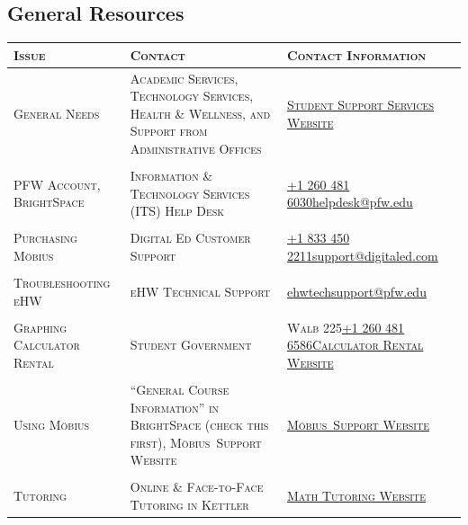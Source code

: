 \documentclass[letterpaper,twoside]{article}
\def\Mobius{M\"obius\ }
\begin{document}
    \subsection*{General Resources}
    \begin{center}
        \onehalfspacing
        \begin{tabularx}{\columnwidth}{lXX}
            \textsc{Issue} & \textsc{Contact} & \textsc{Contact Information}\\
            \hline
            \textsc{General Needs} & \textsc{Academic Services, Technology Services, Health \& Wellness, and Support from Administrative Offices} & \textsc{\href{https://www.pfw.edu/offices/enhancement-learning-teaching/pedagogical-resources/student-support-services}{Student Support Services Website}}\\
            \\
            \textsc{PFW Account, BrightSpace} &\textsc{Information \& Technology Services (ITS) Help Desk} & \href{tel:12604816030}{+1 260 481 6030}\newline\href{mailto:helpdesk@pfw.edu}{helpdesk@pfw.edu}\\
            \\
            \textsc{Purchasing \Mobius} & \textsc{Digital Ed Customer Support} & \href{tel:18334502211}{+1 833 450 2211}\newline\href{mailto:support@digitaled.com}{support@digitaled.com} \\
            \\
            \textsc{Troubleshooting eHW} & \textsc{eHW Technical Support} & \href{mailto:ehwtechsupport@pfw.edu}{ehwtechsupport@pfw.edu} \\
            \\
            \textsc{Graphing Calculator Rental} & \textsc{Student Government} & \textsc{Walb 225}\newline\href{tel:12604816586}{+1 260 481 6586}\newline\href{https://www.pfw.edu/student-government/services/rentals}{\textsc{Calculator Rental Website}}\\
            \\
            \textsc{Using \Mobius} & \textsc{``General Course Information'' in BrightSpace (check this first), \Mobius Support Website} & \href{https://digitaled.com/support/help/Content/Students Home.htm}{\textsc{\Mobius Support Website}}\\
            \\
            \textsc{Tutoring} & \textsc{Online \& Face-to-Face Tutoring in Kettler} & \href{https://www.pfw.edu/offices/learning-support/math-science-testing-center/}{\textsc{Math Tutoring Website}}\\

\end{tabularx}
\end{center}
\end{document}
